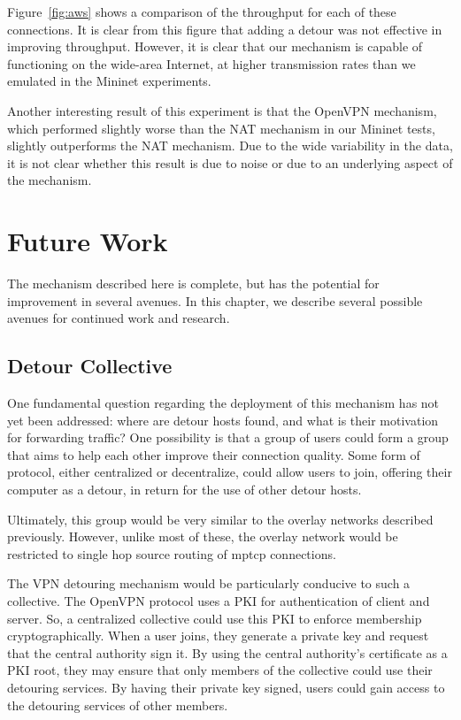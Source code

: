 \documentclass{cwru}
\begin{document}
Figure~\ref{fig:aws} shows a comparison of the throughput for each of these
connections. It is clear from this figure that adding a detour was not effective
in improving throughput. However, it is clear that our mechanism is capable of
functioning on the wide-area Internet, at higher transmission rates than we
emulated in the Mininet experiments.

Another interesting result of this experiment is that the OpenVPN mechanism,
which performed slightly worse than the NAT mechanism in our Mininet tests,
slightly outperforms the NAT mechanism. Due to the wide variability in the data,
it is not clear whether this result is due to noise or due to an underlying
aspect of the mechanism.

\chapter{Future Work}
\label{c:fw}

The mechanism described here is complete, but has the potential for improvement
in several avenues. In this chapter, we describe several possible avenues for
continued work and research.

\section{Detour Collective}

One fundamental question regarding the deployment of this mechanism has not yet
been addressed: where are detour hosts found, and what is their motivation for
forwarding traffic? One possibility is that a group of users could form a group
that aims to help each other improve their connection quality. Some form of
protocol, either centralized or decentralize, could allow users to join,
offering their computer as a detour, in return for the use of other detour
hosts.

Ultimately, this group would be very similar to the overlay networks described
previously. However, unlike most of these, the overlay network would be
restricted to single hop source routing of \ac{mptcp} connections.

The VPN detouring mechanism would be particularly conducive to such a
collective. The OpenVPN protocol uses a PKI for authentication of client and
server. So, a centralized collective could use this PKI to enforce membership
cryptographically. When a user joins, they generate a private key and request
that the central authority sign it. By using the central authority's certificate
as a PKI root, they may ensure that only members of the collective could use
their detouring services. By having their private key signed, users could gain
access to the detouring services of other members.
\end{document}
